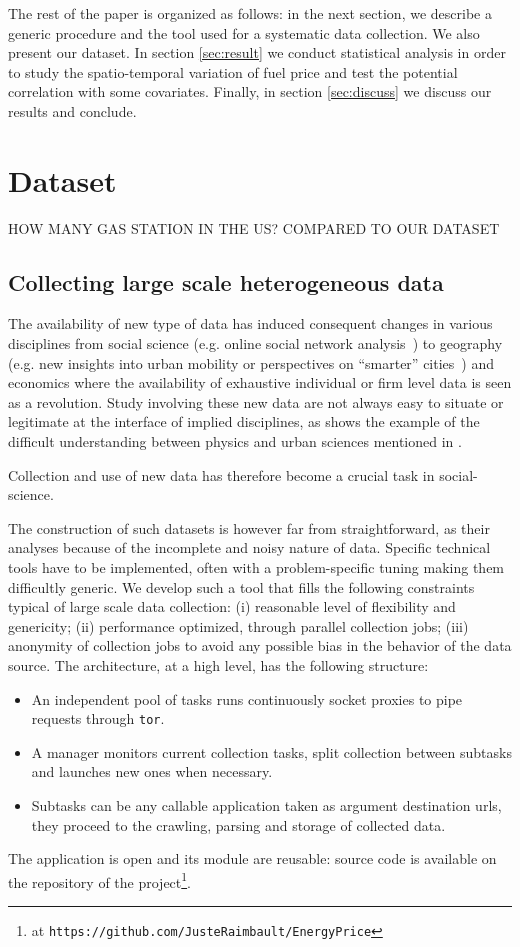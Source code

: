 \documentclass[3p,times,procedia]{elsarticle}
\begin{document}
The rest of the paper is organized as follows: in the next section, we describe a generic procedure and the tool used for a systematic data collection. We also present our dataset. In section \ref{sec:result} we conduct statistical analysis in order to study the spatio-temporal variation of fuel price and test the potential correlation with some covariates. Finally, in section \ref{sec:discuss} we discuss our results and conclude.

\section{Dataset} \label{sec:data}
HOW MANY GAS STATION IN THE US? COMPARED TO OUR DATASET
\subsection{Collecting large scale heterogeneous data}

The availability of new type of data has induced consequent changes in various disciplines from social science (e.g. online social network analysis~\cite{tan2013social}) to geography (e.g. new insights into urban mobility or perspectives on ``smarter'' cities~\cite{batty2013big}) and economics where the availability of exhaustive individual or firm level data is seen as a revolution. Study involving these new data are not always easy to situate or legitimate at the interface of implied disciplines, as shows the example of the difficult understanding between physics and urban sciences mentioned in \cite{dupuy2015sciences}. 

Collection and use of new data has therefore become a crucial task in social-science. 

The construction of such datasets is however far from straightforward, as their analyses because of the incomplete and noisy nature of data. Specific technical tools have to be implemented, often with a problem-specific tuning making them difficultly generic. We develop such a tool that fills the following constraints typical of large scale data collection: (i) reasonable level of flexibility and genericity; (ii) performance optimized, through parallel collection jobs; (iii) anonymity of collection jobs to avoid any possible bias in the behavior of the data source. The architecture, at a high level, has the following structure:
\begin{itemize}
\item An independent pool of tasks runs continuously socket proxies to pipe requests through \texttt{tor}.
\item A manager monitors current collection tasks, split collection between subtasks and launches new ones when necessary.
\item Subtasks can be any callable application taken as argument destination urls, they proceed to the crawling, parsing and storage of collected data.
\end{itemize}
The application is open and its module are reusable: source code is available on the repository of the project\footnote{at \texttt{https://github.com/JusteRaimbault/EnergyPrice}}.
\end{document}
